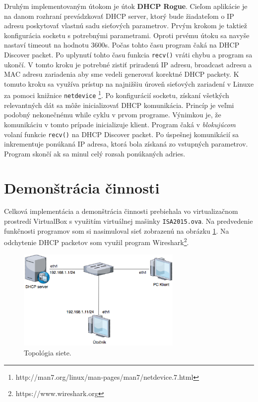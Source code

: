 \documentclass{article}
\begin{document}
Druhým implementovaným útokom je útok \textbf{DHCP Rogue}. Cieľom aplikácie je na danom rozhraní prevádzkovať DHCP server, ktorý bude žiadateľom o IP adresu poskytovať vlastnú sadu sieťových parametrov. Prvým krokom je taktiež konfigurácia socketu s potrebnými parametrami. Oproti prvému útoku sa navyše nastaví timeout na hodnotu 3600s. Počas tohto času program čaká na DHCP Discover packet. Po uplynutí tohto času funkcia \texttt{recv()} vráti chybu a program sa ukončí. V tomto kroku je potrebné zistiť priradenú IP adresu, broadcast adresu a MAC adresu zariadenia aby sme vedeli generovať korektné DHCP packety. K tomuto kroku sa využíva prístup na najnižšiu úroveň sieťových zariadení v Linuxe za pomoci knižnice \texttt{netdevice} \footnote{http://man7.org/linux/man-pages/man7/netdevice.7.html}. Po konfigurácií socketu, získaní všetkých relevantných dát sa môže inicializovať DHCP komunikácia. Princíp je veľmi podobný nekonečnému while cyklu v prvom programe. Výnimkou je, že komunikáciu v tomto prípade inicializuje klient. Program čaká v \textit{blokujúcom} volaní funkcie \texttt{recv()} na DHCP Discover packet. Po úspešnej komunikácií sa inkrementuje ponúkaná IP adresa, ktorá bola získaná zo vstupných parametrov. Program skončí ak sa minul celý rozsah ponúkaných adries.

\section{Demonštrácia činnosti}

Celková implementácia a demonštrácia činnosti prebiehala vo virtualizačnom prostredí VirtualBox s využitím virtuálnej mašinky \texttt{ISA2015.ova}. Na predvedenie funkčnosti programov som si nasimuloval sieť zobrazenú na obrázku \ref{fig:diagramsite}. Na odchytenie DHCP packetov som využil program Wireshark\footnote{https://www.wireshark.org}.

\begin{figure}[h]
    \centering
    \includegraphics[width=300px]{pic/diagramsite.png}
    \caption{Topológia siete.}
    \label{fig:diagramsite}
\end{figure}
\end{document}
